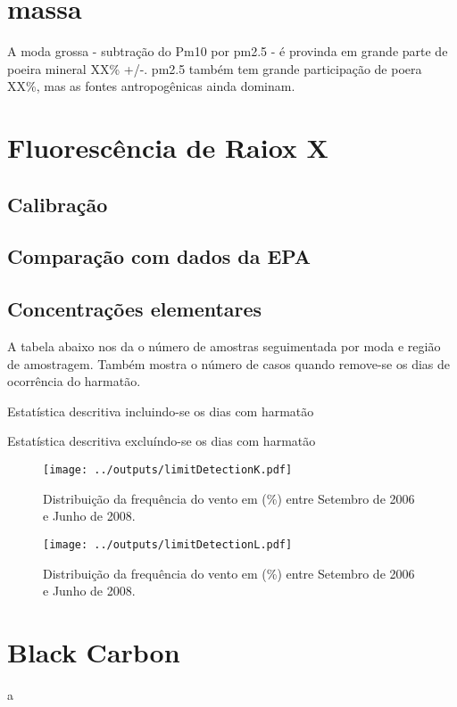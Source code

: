 \section{massa}

A moda grossa - subtração do Pm10 por pm2.5 - é provinda em grande parte
de poeira mineral XX\% +/-. pm2.5 também tem grande participação de poera XX\%, 
mas as fontes antropogênicas ainda dominam.

\section{Fluorescência de Raiox X}

\subsection{Calibração}

\subsection{Comparação com dados da EPA}


\subsection{Concentrações elementares}
A tabela abaixo nos da o número de amostras seguimentada por
moda e região de amostragem. 
Também mostra o número de casos quando remove-se os dias de ocorrência do harmatão.

\begin{table}[H]
 \centering
  
  \caption{Estatística descritiva incluindo-se os dias com harmatão}
\end{table}

\begin{table}[H]
  \centering
  
  \caption{Estatística descritiva excluíndo-se os dias com harmatão}
\end{table}

\begin{figure}[H]
\begin{center}
  \texttt{[image: ../outputs/limitDetectionK.pdf]}
  \caption{Distribuição da frequência do vento em (\%) entre
           Setembro de 2006 e Junho de 2008.}
\end{center}
\end{figure}

\begin{figure}[H]
\begin{center}
  \texttt{[image: ../outputs/limitDetectionL.pdf]}
  \caption{Distribuição da frequência do vento em (\%) entre
           Setembro de 2006 e Junho de 2008.}
\end{center}
\end{figure}

\section{Black Carbon}
a


